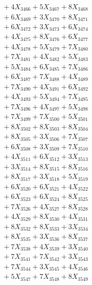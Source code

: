 \documentclass[a4paper,10pt]{article}
\begin{document}
{\begin{align}
&\;  + 4 X_{3466} + 5 X_{3467} + 8 X_{3468} \\[0.3ex]
&\;  + 6 X_{3469} + 3 X_{3470} + 8 X_{3471} \\[0.3ex]
&\;  + 6 X_{3472} + 3 X_{3473} + 6 X_{3474} \\[0.3ex]
&\;  + 4 X_{3475} + 8 X_{3476} + 6 X_{3477} \\[0.3ex]
&\;  + 4 X_{3478} + 5 X_{3479} + 7 X_{3480} \\[0.3ex]
&\;  + 7 X_{3481} + 4 X_{3482} + 5 X_{3483} \\[0.3ex]
&\;  + 5 X_{3484} + 6 X_{3485} + 7 X_{3486} \\[0.3ex]
&\;  + 6 X_{3487} + 7 X_{3488} + 4 X_{3489} \\[0.5ex]\allowbreak
&\;  + 7 X_{3490} + 4 X_{3491} + 6 X_{3492} \\[0.3ex]
&\;  + 4 X_{3493} + 5 X_{3494} + 7 X_{3495} \\[0.3ex]
&\;  + 7 X_{3496} + 4 X_{3497} + 5 X_{3498} \\[0.3ex]
&\;  + 7 X_{3499} + 7 X_{3500} + 5 X_{3501} \\[0.3ex]
&\;  + 8 X_{3502} + 8 X_{3503} + 8 X_{3504} \\[0.3ex]
&\;  + 8 X_{3505} + 3 X_{3506} + 7 X_{3507} \\[0.3ex]
&\;  + 6 X_{3508} + 3 X_{3509} + 7 X_{3510} \\[0.3ex]
&\;  + 4 X_{3511} + 6 X_{3512} + 3 X_{3513} \\[0.3ex]
&\;  + 3 X_{3514} + 8 X_{3515} + 8 X_{3516} \\[0.3ex]
&\;  + 8 X_{3517} + 3 X_{3518} + 5 X_{3519} \\[0.5ex]\allowbreak
&\;  + 6 X_{3520} + 6 X_{3521} + 4 X_{3522} \\[0.3ex]
&\;  + 6 X_{3523} + 6 X_{3524} + 8 X_{3525} \\[0.3ex]
&\;  + 7 X_{3526} + 4 X_{3527} + 8 X_{3528} \\[0.3ex]
&\;  + 4 X_{3529} + 8 X_{3530} + 4 X_{3531} \\[0.3ex]
&\;  + 8 X_{3532} + 8 X_{3533} + 3 X_{3534} \\[0.3ex]
&\;  + 8 X_{3535} + 3 X_{3536} + 8 X_{3537} \\[0.3ex]
&\;  + 7 X_{3538} + 4 X_{3539} + 3 X_{3540} \\[0.3ex]
&\;  + 7 X_{3541} + 7 X_{3542} + 3 X_{3543} \\[0.3ex]
&\;  + 7 X_{3544} + 3 X_{3545} + 4 X_{3546} \\[0.3ex]
&\;  + 5 X_{3547} + 7 X_{3548} + 8 X_{3549} \\[0.5ex]\allowbreak

\end{align}}
\end{document}
